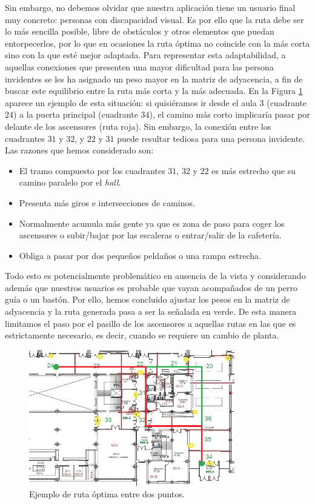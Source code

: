 Sin embargo, no debemos olvidar que nuestra aplicación tiene un usuario final muy concreto: personas con discapacidad visual. Es por ello que la ruta debe ser lo más sencilla posible, libre de obstáculos y otros elementos que puedan entorpecerlos, por lo que en ocasiones la ruta óptima no coincide con la más corta sino con la que esté mejor adaptada. Para representar esta adaptabilidad, a aquellas conexiones que presenten una mayor dificultad para las persona invidentes se les ha asignado un peso mayor en la matriz de adyacencia, a fin de buscar este equilibrio entre la ruta más corta y la más adecuada. En la Figura \ref{fig:ruta_optima} aparece un ejemplo de esta situación: si quisiéramos ir desde el aula 3 (cuadrante $24$) a la puerta principal (cuadrante $34$), el camino más corto implicaría pasar por delante de los ascensores (ruta roja). Sin embargo, la conexión entre los cuadrantes $31$ y $32$, y $22$ y $31$ puede resultar tediosa para una persona invidente. Las razones que hemos considerado son: 
\begin{itemize}
	\item El tramo compuesto por los cuadrantes $31$, $32$ y $22$ es más estrecho que su camino paralelo por el \textit{hall}.
	\item Presenta más giros e intersecciones de caminos.
	\item Normalmente acumula más gente ya que es zona de paso para coger los ascensores o subir/bajar por las escaleras o entrar/salir de la cafetería.
	\item Obliga a pasar por dos pequeños peldaños o una rampa estrecha.
\end{itemize} 
 	Todo esto es potencialmente problemático en ausencia de la vista y considerando además que nuestros usuarios es probable que vayan acompañados de un perro guía o un bastón. Por ello, hemos concluido ajustar los pesos en la matriz de adyacencia y la ruta generada pasa a ser la señalada en verde. De esta manera limitamos el paso por el pasillo de los ascensores a aquellas rutas en las que es estrictamente necesario, es decir, cuando se requiere un cambio de planta.


\begin{figure}[t]
	\centering
	\includegraphics[width=0.8\textwidth]{Imagenes/Capitulo4/mapa_ruta_optima}
	\caption{Ejemplo de ruta óptima entre dos puntos.}
	\label{fig:ruta_optima}
\end{figure}

